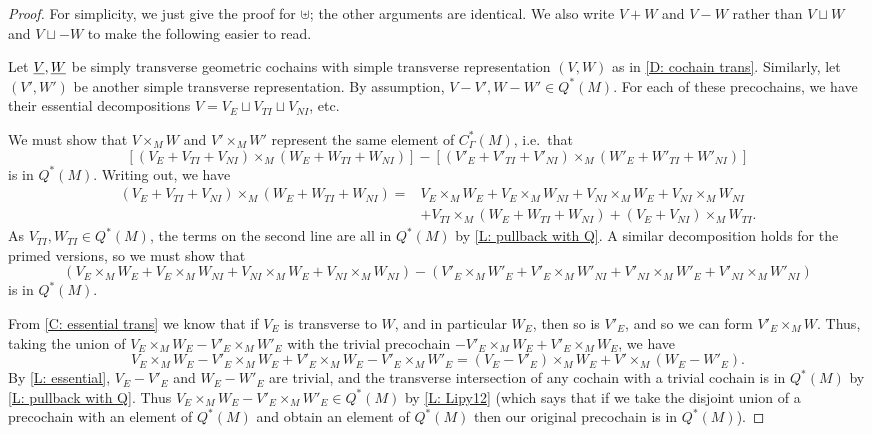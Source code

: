\begin{proof}
	For simplicity, we just give the proof for $\uplus$; the other arguments are identical.
	We also write $V+W$ and $V-W$ rather than $V \sqcup W$ and $V\sqcup-W$ to make the following easier to read.

	Let $\underline{V},\underline{W}$ be simply transverse geometric cochains with simple transverse representation $(V, W)$ as in \cref{D: cochain trans}.
	Similarly, let $(V',W')$ be another simple transverse representation.
	By assumption, $V-V', W-W' \in Q^*(M)$.
	For each of these precochains, we have their essential decompositions $V = V_E \sqcup V_{TI} \sqcup V_{NI}$, etc.

	We must show that $V \times_M W$ and $V' \times_M W'$ represent the same element of $C^*_\Gamma(M)$, i.e.\ that
	$$[(V_E+V_{TI}+V_{NI}) \times_M (W_E+W_{TI}+W_{NI})] - [(V'_E+V'_{TI}+V'_{NI}) \times_M (W'_E+W'_{TI}+W'_{NI})]$$
	is in $Q^*(M)$.
	Writing out, we have
	\begin{align*}(V_E+V_{TI}+V_{NI}) \times_M (W_E+W_{TI}+W_{NI}) = &V_E \times_M W_E+V_E \times_M W_{NI}+V_{NI} \times_M W_E+V_{NI} \times_M W_{NI}\\
		&+V_{TI} \times_M (W_E+W_{TI}+W_{NI})+(V_E+V_{NI}) \times_M W_{TI}.
	\end{align*}
	As $V_{TI},W_{TI} \in Q^*(M)$, the terms on the second line are all in $Q^*(M)$ by \cref{L: pullback with Q}.
	A similar decomposition holds for the primed versions, so we must show that
	\begin{equation}\label{E: intersect}
		(V_E \times_M W_E+V_E \times_M W_{NI}+V_{NI} \times_M W_E+V_{NI} \times_M W_{NI})-(V'_E \times_M W'_E+V'_E \times_M W'_{NI}+V'_{NI} \times_M W'_E+V'_{NI} \times_M W'_{NI})
	\end{equation}
	is in $Q^*(M)$.

	From \cref{C: essential trans} we know that if $V_E$ is transverse to $W$, and in particular $W_E$, then so is $V'_E$, and so we can form $V'_E \times_M W$.
	Thus, taking the union of $V_E \times_M W_E -V'_E \times_M W'_E$ with the trivial precochain $-V'_E \times_M W_E+V'_E \times_M W_E$, we have
	\begin{equation*}
		V_E \times_M W_E-V'_E \times_M W_E+V'_E \times_M W_E-V'_E \times_M W'_E = (V_E-V'_E) \times_M W_E+V' \times_M (W_E-W'_E).
	\end{equation*}
	By \cref{L: essential}, $V_E-V'_E$ and $W_E-W'_E$ are trivial, and the transverse intersection of any cochain with a trivial cochain is in $Q^*(M)$ by \cref{L: pullback with Q}.
	Thus $V_E \times_M W_E -V'_E \times_M W'_E \in Q^*(M)$ by \cref{L: Lipy12} (which says that if we take the disjoint union of a precochain with an element of $Q^*(M)$ and obtain an element of $Q^*(M)$ then our original precochain is in $Q^*(M)$).


\end{proof}
